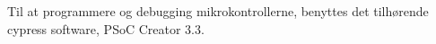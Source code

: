 Til at programmere og debugging mikrokontrollerne, benyttes det tilhørende cypress software, PSoC Creator 3.3. 






